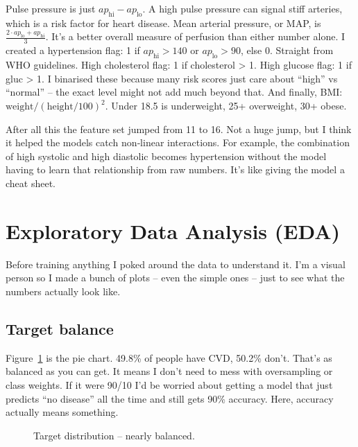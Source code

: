 \documentclass[11pt, a4paper, oneside]{book}
\begin{document}
Pulse pressure is just $ap_{\text{hi}} - ap_{\text{lo}}$. A high pulse pressure can signal stiff arteries, which is a risk factor for heart disease. Mean arterial pressure, or MAP, is $\frac{2 \cdot ap_{\text{lo}} + ap_{\text{hi}}}{3}$. It’s a better overall measure of perfusion than either number alone. I created a hypertension flag: 1 if $ap_{\text{hi}} > 140$ or $ap_{\text{lo}} > 90$, else 0. Straight from WHO guidelines. High cholesterol flag: 1 if cholesterol > 1. High glucose flag: 1 if gluc > 1. I binarised these because many risk scores just care about “high” vs “normal” – the exact level might not add much beyond that. And finally, BMI: $\text{weight} / (\text{height}/100)^2$. Under 18.5 is underweight, 25+ overweight, 30+ obese.

After all this the feature set jumped from 11 to 16. Not a huge jump, but I think it helped the models catch non‑linear interactions. For example, the combination of high systolic and high diastolic becomes hypertension without the model having to learn that relationship from raw numbers. It’s like giving the model a cheat sheet.

\section{Exploratory Data Analysis (EDA)}
Before training anything I poked around the data to understand it. I’m a visual person so I made a bunch of plots – even the simple ones – just to see what the numbers actually look like.

\subsection{Target balance}
Figure~\ref{fig:target_pie} is the pie chart. 49.8\% of people have CVD, 50.2\% don’t. That’s as balanced as you can get. It means I don’t need to mess with oversampling or class weights. If it were 90/10 I’d be worried about getting a model that just predicts “no disease” all the time and still gets 90\% accuracy. Here, accuracy actually means something.

\begin{figure}[htbp]
\centering
{}
\caption{Target distribution – nearly balanced.}
\label{fig:target_pie}
\end{figure}
\end{document}
